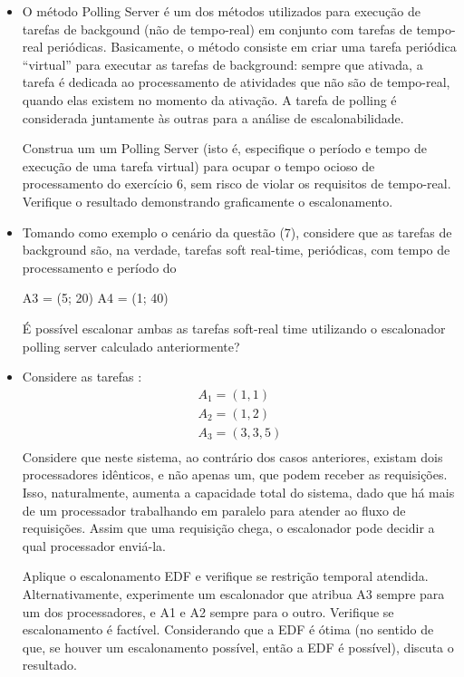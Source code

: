 \documentclass[12pt,a4paper]{article}
\begin{document}
\begin{itemize}
\item O método Polling Server é um dos métodos utilizados para execução de tarefas de backgound (não de tempo-real) em conjunto com tarefas de tempo-real periódicas. Basicamente, o método consiste em criar uma tarefa periódica “virtual” para executar as tarefas de background: sempre que ativada, a tarefa é dedicada ao processamento de atividades que não são de tempo-real, quando elas existem no momento da ativação. A tarefa de polling é considerada juntamente às outras para a análise de escalonabilidade.  

Construa um um Polling Server (isto é, especifique o período e tempo de execução de uma tarefa virtual) para ocupar o tempo ocioso de processamento do exercício 6, sem risco de violar os requisitos de tempo-real.  Verifique o resultado demonstrando graficamente o escalonamento.

\item Tomando como exemplo o cenário da questão (7), considere que as tarefas de background são, na verdade, tarefas soft real-time, periódicas, com tempo de processamento e período do

A3 = (5; 20)
A4 = (1; 40)

É possível escalonar ambas as tarefas soft-real time utilizando o escalonador polling server calculado anteriormente?

\item Considere as tarefas :
\begin{align*}
  A_1 = (1, 1) \\
  A_2 = (1, 2) \\
  A_3 = (3, 3,5) \\
\end{align*}
Considere que neste sistema, ao contrário dos casos anteriores, existam dois processadores idênticos, e não apenas um, que podem receber as requisições. Isso, naturalmente, aumenta a capacidade total do sistema, dado que há mais de um processador trabalhando em paralelo para atender ao fluxo de requisições. Assim que uma requisição chega, o escalonador pode decidir a qual processador enviá-la. 

Aplique o escalonamento EDF e verifique se restrição temporal atendida.
Alternativamente, experimente um escalonador que atribua A3 sempre para um dos processadores, e A1 e A2 sempre para o outro. Verifique se escalonamento é factível.
Considerando que a EDF é ótima (no sentido de que, se houver um escalonamento possível, então a EDF é possível), discuta o resultado.
\end{itemize}
\end{document}
